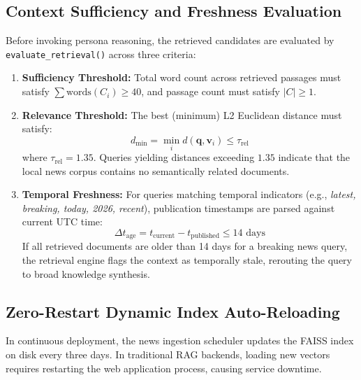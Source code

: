 \subsection{Context Sufficiency and Freshness Evaluation}
Before invoking persona reasoning, the retrieved candidates are evaluated by \texttt{evaluate\_retrieval()} across three criteria:
\begin{enumerate}
    \item \textbf{Sufficiency Threshold:} Total word count across retrieved passages must satisfy $\sum \text{words}(C_i) \ge 40$, and passage count must satisfy $|C| \ge 1$.
    \item \textbf{Relevance Threshold:} The best (minimum) L2 Euclidean distance must satisfy:
    \begin{equation}
    d_{\text{min}} = \min_{i} d(\mathbf{q}, \mathbf{v}_i) \le \tau_{\text{rel}}
    \end{equation}
    where $\tau_{\text{rel}} = 1.35$. Queries yielding distances exceeding $1.35$ indicate that the local news corpus contains no semantically related documents.
    \item \textbf{Temporal Freshness:} For queries matching temporal indicators (e.g., \emph{latest, breaking, today, 2026, recent}), publication timestamps are parsed against current UTC time:
    \begin{equation}
    \Delta t_{\text{age}} = t_{\text{current}} - t_{\text{published}} \le 14\text{ days}
    \end{equation}
    If all retrieved documents are older than 14 days for a breaking news query, the retrieval engine flags the context as temporally stale, rerouting the query to broad knowledge synthesis.
\end{enumerate}

\subsection{Zero-Restart Dynamic Index Auto-Reloading}
In continuous deployment, the news ingestion scheduler updates the FAISS index on disk every three days. In traditional RAG backends, loading new vectors requires restarting the web application process, causing service downtime. 

